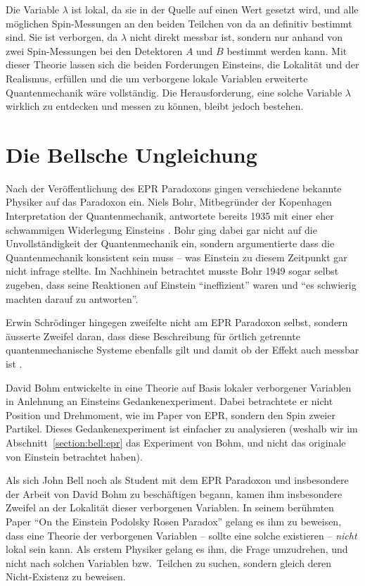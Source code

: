 \begin{refsection}
Die Variable $\lambda$ ist lokal, da sie in der Quelle auf einen Wert gesetzt
wird, und alle m\"oglichen Spin-Messungen an den beiden Teilchen von da an
definitiv bestimmt sind.
Sie ist verborgen, da $\lambda$ nicht direkt messbar ist, sondern nur
anhand von zwei Spin-Messungen bei den Detektoren $A$ und $B$ bestimmt werden 
kann.
Mit dieser Theorie lassen sich die beiden Forderungen Einsteins, die Lokalit\"at
und der Realismus, erf\"ullen und die um verborgene lokale Variablen erweiterte
Quantenmechanik w\"are vollst\"andig.
Die Herausforderung, eine solche Variable $\lambda$ wirklich zu entdecken und
messen zu k\"onnen, bleibt jedoch bestehen.

\section{Die Bellsche Ungleichung\label{section:bell:bell}}
Nach der Ver\"offentlichung des EPR Paradoxons gingen verschiedene bekannte
Physiker auf das Paradoxon ein.
Niels Bohr, Mitbegr\"under der Kopenhagen Interpretation der Quantenmechanik,
antwortete bereits 1935 mit einer eher schwammigen Widerlegung Einsteins
\cite{Bell:Bohr1935}.
Bohr ging dabei gar nicht auf die Unvollst\"andigkeit der Quantenmechanik ein,
sondern argumentierte dass die Quantenmechanik konsistent sein muss -- was
Einstein zu diesem Zeitpunkt gar nicht infrage stellte.
Im Nachhinein betrachtet musste Bohr 1949 sogar selbst zugeben, dass seine
Reaktionen auf Einstein \enquote{ineffizient} waren und 
\enquote{es schwierig machten darauf zu antworten}. 

Erwin Schr\"odinger hingegen zweifelte nicht am EPR Paradoxon selbst, sondern
\"ausserte Zweifel daran, dass diese Beschreibung f\"ur \"ortlich getrennte
quantenmechanische Systeme ebenfalls gilt und damit ob der Effekt auch
messbar ist \cite{Bell:Schroedinger1936}.

David Bohm entwickelte in \cite{Bell:Bohm1952} eine Theorie auf Basis
lokaler verborgener Variablen in Anlehnung an Einsteins Gedankenexperiment.
Dabei betrachtete er nicht  Position und Drehmoment, wie im Paper von EPR,
sondern den Spin zweier Partikel.
Dieses Gedankenexperiment ist einfacher zu analysieren (weshalb wir im
Abschnitt~\ref{section:bell:epr} das Experiment von Bohm, und nicht das
originale von Einstein betrachtet haben).

Als sich John Bell noch als Student mit dem EPR Paradoxon und insbesondere
der Arbeit von David Bohm zu besch\"aftigen begann, kamen ihm insbesondere
Zweifel an der Lokalit\"at dieser verborgenen Variablen.
In seinem ber\"uhmten Paper
\enquote{On the Einstein Podolsky Rosen Paradox} \cite{Bell:Bell1964}
gelang es ihm zu beweisen, dass eine Theorie der verborgenen Variablen -- sollte
eine solche existieren -- \emph{nicht} lokal sein kann.
Als erstem Physiker gelang es ihm, die Frage umzudrehen, und nicht nach solchen
Variablen bzw.~Teilchen zu suchen, sondern gleich deren Nicht-Existenz
zu beweisen.


\end{refsection}
